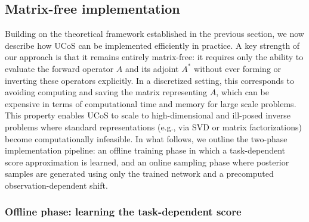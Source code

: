 \documentclass[10pt]{article} %
\theoremstyle{plain}
\theoremstyle{definition}
\theoremstyle{remark}
\newcommand{\fabian}[1]{{#1}}%
\begin{document}
\subsection{Matrix-free implementation}
\label{sec:matrix_free_implementation}
Building on the theoretical framework established in the previous section, we now describe how UCoS can be implemented efficiently in practice. A key strength of our approach is that it remains entirely matrix-free: it requires only the ability to evaluate the forward operator \(A\) and its adjoint \(A^*\) without ever forming or inverting these operators explicitly. \fabian{In a discretized setting, this corresponds to avoiding computing and saving the matrix representing $A$, which can be expensive in terms of computational time and memory for large scale problems.} This property enables UCoS to scale to high-dimensional and ill-posed inverse problems where standard representations (e.g., via SVD or matrix factorizations) become computationally infeasible. 
In what follows, we outline the two-phase implementation pipeline: an offline training phase in which a task-dependent score approximation is learned, and an online sampling phase where posterior samples are generated using only the trained network and a precomputed observation-dependent shift.
%
%
\subsubsection{Offline phase: learning the task-dependent score}
\end{document}
